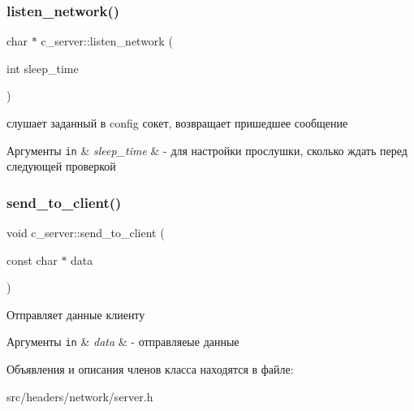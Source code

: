 \subsubsection{\texorpdfstring{listen\+\_\+network()}{listen\_network()}}
{\footnotesize\ttfamily char $\ast$ c\+\_\+server\+::listen\+\_\+network (\begin{DoxyParamCaption}\item[{int}]{sleep\+\_\+time }\end{DoxyParamCaption})}



слушает заданный в config сокет, возвращает пришедшее сообщение 


\begin{DoxyParams}[1]{Аргументы}
\mbox{\tt in}  & {\em sleep\+\_\+time} & -\/ для настройки прослушки, сколько ждать перед следующей проверкой \\
\hline
\end{DoxyParams}
\mbox{\label{classc__server_aa7c934f59238687f22365e4c23dddfe4}} 
\subsubsection{\texorpdfstring{send\+\_\+to\+\_\+client()}{send\_to\_client()}}
{\footnotesize\ttfamily void c\+\_\+server\+::send\+\_\+to\+\_\+client (\begin{DoxyParamCaption}\item[{const char $\ast$}]{data }\end{DoxyParamCaption})}



Отправляет данные клиенту 


\begin{DoxyParams}[1]{Аргументы}
\mbox{\tt in}  & {\em data} & -\/ отправляеые данные \\
\hline
\end{DoxyParams}


Объявления и описания членов класса находятся в файле\+:\begin{DoxyCompactItemize}
\item 
src/headers/network/server.\+h\end{DoxyCompactItemize}
